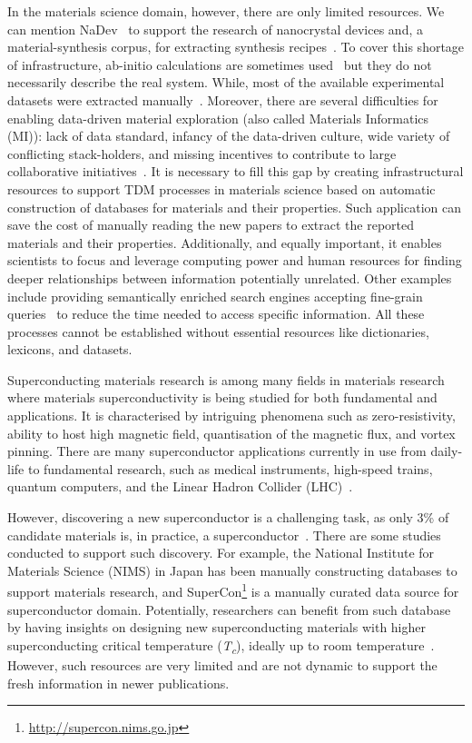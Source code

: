 \documentclass[fleqn,10pt]{wlscirep}
\begin{document}
In the materials science domain, however, there are only limited resources. We can mention NaDev~\cite{Dieb2016} to support the research of nanocrystal devices and, a material-synthesis corpus, for extracting synthesis recipes~\cite{kononova_text-mined_2019}. 
To cover this shortage of infrastructure, ab-initio calculations are sometimes used~\cite{Jain2013CommentaryTM_materialsProject} but they do not necessarily describe the real system. While, most of the available experimental datasets were extracted manually~\cite{doi:10.1021/cm400893e}. 
Moreover, there are several difficulties for enabling data-driven material exploration (also called Materials Informatics (MI)): lack of data standard, infancy of the data-driven culture, wide variety of conflicting stack-holders, and missing incentives to contribute to large collaborative initiatives~\cite{Hill2016MaterialsSW}. 
It is necessary to fill this gap by creating infrastructural resources to support TDM processes in materials science based on automatic construction of databases for materials and their properties. 
Such application can save the cost of manually reading the new papers to extract the reported materials and their properties. 
Additionally, and equally important, it enables scientists to focus and leverage computing power and human resources for finding deeper relationships between information potentially unrelated. 
Other examples include providing semantically enriched search engines accepting fine-grain queries~\cite{Liu2019SurfaceMR} to reduce the time needed to access specific information. 
All these processes cannot be established without essential resources like dictionaries, lexicons, and datasets. 

Superconducting materials research is among many fields in materials research where materials superconductivity is being studied for both fundamental and applications. It is characterised by intriguing phenomena such as zero-resistivity, ability to host high magnetic field, quantisation of the magnetic flux, and vortex pinning.  
There are many superconductor applications currently in use from daily-life to fundamental research, such as medical instruments, high-speed trains, quantum computers, and the Linear Hadron Collider (LHC)~\cite{PhilippeBook, Kizu2010ConstructionOT, Cardani2017NewAO}. 

However, discovering a new superconductor is a challenging task, as only 3\% of candidate materials is, in practice, a superconductor~\cite{Konno2018DeepLO}.
There are some studies conducted to support such discovery.
For example, the National Institute for Materials Science (NIMS) in Japan has been manually constructing databases to support materials research, and SuperCon\footnote{\url{http://supercon.nims.go.jp}} is a manually curated data source for superconductor domain. 
Potentially, researchers can benefit from such database by having insights on designing new superconducting materials with higher superconducting critical temperature (\textit{T\textsubscript{c}}), ideally up to room temperature~\cite{Hamlin2019SuperconductivityNR,stanev2017machine}.
However, such resources are very limited and are not dynamic to support the fresh information in newer publications.
\end{document}
